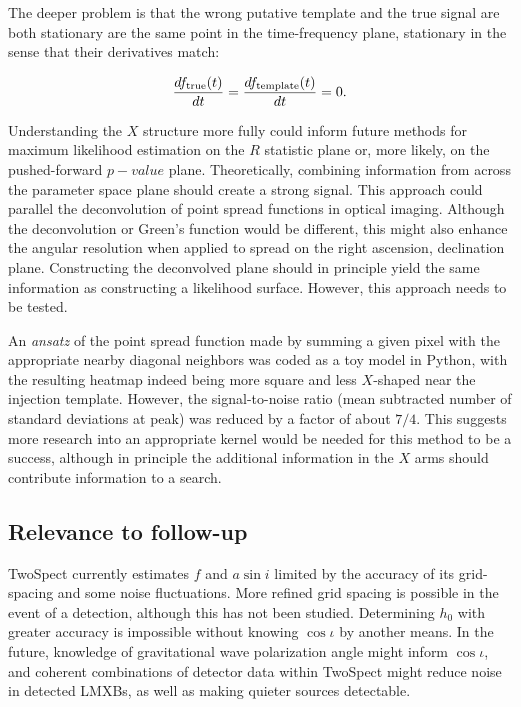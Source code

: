 The deeper problem is that the wrong putative template and the true signal are both stationary are the same point in the time-frequency plane, stationary in the sense that their derivatives match:

\begin{equation}
\frac{df_\textup{true} (t)}{dt} = \frac{df_\textup{template}(t)}{dt} = 0.
\end{equation}

Understanding the $X$ structure more fully could inform future methods for maximum likelihood estimation on the $R$ statistic plane or, more likely, on the pushed-forward $p-value$ plane.
Theoretically, combining information from across the parameter space plane should create a strong signal.
This approach could parallel the deconvolution of point spread functions in optical imaging.
Although the deconvolution or Green's function would be different, this might also enhance the angular resolution when applied to spread on the right ascension, declination plane.
Constructing the deconvolved plane should in principle yield the same information as constructing a likelihood surface.
However, this approach needs to be tested.

An \textit{ansatz} of the point spread function made by summing a given pixel with the appropriate nearby diagonal neighbors was coded as a toy model in Python, with the resulting heatmap indeed being more square and less $X$-shaped near the injection template. However, the signal-to-noise ratio (mean subtracted number of standard deviations at peak) was reduced by a factor of about $7/4$. This suggests more research into an appropriate kernel would be needed for this method to be a success, although in principle the additional information in the $X$ arms should contribute information to a search. 

\subsection{Relevance to follow-up}

TwoSpect currently estimates $f$ and $a \sin i$ limited by the accuracy of its grid-spacing and some noise fluctuations. 
More refined grid spacing is possible in the event of a detection, although this has not been studied. 
Determining $h_0$ with greater accuracy is impossible without knowing $\cos \iota$ by another means. 
In the future, knowledge of gravitational wave polarization angle might inform $\cos \iota$, and coherent combinations of detector data within TwoSpect might reduce noise in detected LMXBs, as well as making quieter sources detectable. 

